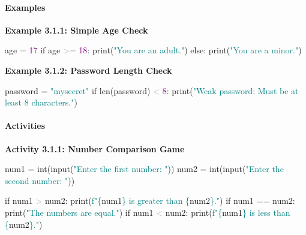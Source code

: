 \documentclass[
  justified,
  openright,
]{tufte-book}
\let\subsubsection\paragraph
\let\paragraph\paragraph
\newcommand{\BuiltInTok}[1]{#1}
\newcommand{\ControlFlowTok}[1]{\textcolor{BrandBlue}{#1}}
\newcommand{\DecValTok}[1]{\textcolor{Purple}{#1}}
\newcommand{\NormalTok}[1]{#1}
\newcommand{\OperatorTok}[1]{\textcolor{DarkGray}{#1}}
\newcommand{\SpecialCharTok}[1]{\textcolor{Teal}{#1}}
\newcommand{\SpecialStringTok}[1]{\textcolor{Teal}{#1}}
\newcommand{\StringTok}[1]{\textcolor{Teal}{#1}}
\newenvironment{Shaded}{%
  \begin{snugshade}
}{%
  \end{snugshade}
}
\let\subsubsection\paragraph
\let\paragraph\paragraph
\begin{document}
\subsubsection{Examples}\label{examples-6}

\textbf{Example 3.1.1: Simple Age Check}

\begin{Shaded}
\begin{Highlighting}[]
\NormalTok{age }\OperatorTok{=} \DecValTok{17}
\ControlFlowTok{if}\NormalTok{ age }\OperatorTok{\textgreater{}=} \DecValTok{18}\NormalTok{:}
    \BuiltInTok{print}\NormalTok{(}\StringTok{"You are an adult."}\NormalTok{)}
\ControlFlowTok{else}\NormalTok{:}
    \BuiltInTok{print}\NormalTok{(}\StringTok{"You are a minor."}\NormalTok{)}
\end{Highlighting}
\end{Shaded}

\textbf{Example 3.1.2: Password Length Check}

\begin{Shaded}
\begin{Highlighting}[]
\NormalTok{password }\OperatorTok{=} \StringTok{"mysecret"}
\ControlFlowTok{if} \BuiltInTok{len}\NormalTok{(password) }\OperatorTok{\textless{}} \DecValTok{8}\NormalTok{:}
    \BuiltInTok{print}\NormalTok{(}\StringTok{"Weak password: Must be at least 8 characters."}\NormalTok{)}
\end{Highlighting}
\end{Shaded}

\subsubsection{Activities}\label{activities-7}

\textbf{Activity 3.1.1: Number Comparison Game}

\begin{Shaded}
\begin{Highlighting}[]
\NormalTok{num1 }\OperatorTok{=} \BuiltInTok{int}\NormalTok{(}\BuiltInTok{input}\NormalTok{(}\StringTok{"Enter the first number: "}\NormalTok{))}
\NormalTok{num2 }\OperatorTok{=} \BuiltInTok{int}\NormalTok{(}\BuiltInTok{input}\NormalTok{(}\StringTok{"Enter the second number: "}\NormalTok{))}

\ControlFlowTok{if}\NormalTok{ num1 }\OperatorTok{\textgreater{}}\NormalTok{ num2:}
    \BuiltInTok{print}\NormalTok{(}\SpecialStringTok{f"}\SpecialCharTok{\{}\NormalTok{num1}\SpecialCharTok{\}}\SpecialStringTok{ is greater than }\SpecialCharTok{\{}\NormalTok{num2}\SpecialCharTok{\}}\SpecialStringTok{."}\NormalTok{)}
\ControlFlowTok{if}\NormalTok{ num1 }\OperatorTok{==}\NormalTok{ num2:}
    \BuiltInTok{print}\NormalTok{(}\StringTok{"The numbers are equal."}\NormalTok{)}
\ControlFlowTok{if}\NormalTok{ num1 }\OperatorTok{\textless{}}\NormalTok{ num2:}
    \BuiltInTok{print}\NormalTok{(}\SpecialStringTok{f"}\SpecialCharTok{\{}\NormalTok{num1}\SpecialCharTok{\}}\SpecialStringTok{ is less than }\SpecialCharTok{\{}\NormalTok{num2}\SpecialCharTok{\}}\SpecialStringTok{."}\NormalTok{)}
\end{Highlighting}
\end{Shaded}
\end{document}
